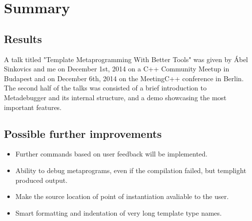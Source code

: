 
\chapter{Summary}

\section{Results}

A talk titled "Template Metaprogramming With Better Tools" was given by Ábel
Sinkovics and me on December 1st, 2014 on a C++ Community
Meetup\cite{cpp-meetup} in Budapest and on December 6th, 2014 on the
MeetingC++ conference\cite{meeting-cpp} in Berlin. The second half of the talks
was consisted of a brief introduction to Metadebugger and its internal
structure, and a demo showcasing the most important features.

\section{Possible further improvements}

\begin{itemize}
    \item
        Further commands based on user feedback will be implemented.
    \item
        Ability to debug metaprograms, even if the compilation failed, but
        templight produced output.
    \item
        Make the source location of point of instantiation avaliable to the
        user.
    \item
        Smart formatting and indentation of very long template type names.
\end{itemize}
